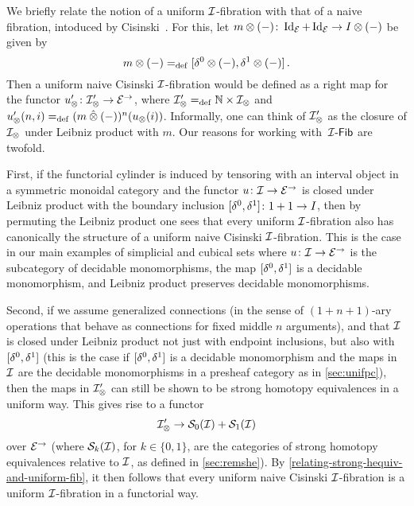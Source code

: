 \documentclass[reqno,10pt,a4paper,oneside,draft]{amsart}
\begin{document}
\begin{remark} We briefly relate the notion of a uniform $\cal{I}$-fibration with that of a naive fibration, intoduced by Cisinski~\cite{cisinski-asterisque}.
For this, let $m \otimes (-)  \co \Id_\catE + \Id_\catE \to \interval \otimes (-)$ be given by 
\[
m \otimes (-) \defeq [\lcyl \otimes (-), \rcyl \otimes (-)]  \, .
\]
Then a uniform naive Cisinski $\cal{I}$-fibration would be defined as a right map for the functor $u_\otimes' \co \cal{I}_\otimes' \to \catE^\to$, where $\cal{I}_\otimes' \defeq \mathbb{N} \times \cal{I}_\otimes$ and $u_\otimes'(n, i) \defeq (m \hatotimes (-))^n(u_\otimes(i))$. Informally, one can think of 
$\cal{I}_\otimes'$ as the closure of  $\cal{I}_\otimes$ under Leibniz product with $m$.
Our reasons for working with~$\Fib[\cal{I}]$ are twofold.

First, if the functorial cylinder is induced by tensoring with an interval object in a symmetric monoidal category and the functor $u \co \cal{I} \to \catE^\to$ is closed under Leibniz product with the boundary inclusion $[\lcyl, \rcyl] \co 1 + 1 \to \interval$, then by permuting the Leibniz product one sees that every uniform $\cal{I}$-fibration also has canonically the structure of a uniform naive Cisinski $\cal{I}$-fibration.
This is the case in our main examples of simplicial and cubical sets where $u \co \cal{I} \to \catE^\to$ is the subcategory of decidable monomorphisms, the map $[\lcyl, \rcyl]$ is a decidable monomorphism, and Leibniz product preserves decidable monomorphisms.

Second, if we assume generalized connections (in the sense of $(1+n+1)$-ary operations that behave as connections for fixed middle $n$ arguments), 
and that $\cal{I}$ is closed under Leibniz product not just with endpoint inclusions, but also with $[\lcyl, \rcyl]$ (this is the case if $[\lcyl, \rcyl]$ is a decidable monomorphism and the maps in $\cal{I}$ are the decidable monomorphisms in a presheaf category as in \cref{sec:unifpc}), then the maps in $\cal{I}_\otimes'$ can still be shown to be strong homotopy equivalences in a uniform way. This gives rise to a functor 
\[
\cal{I}_\otimes' \to \cal{S}_0(\cal{I}) + \cal{S}_1(\cal{I})
\] 
over $\catE^\to$ (where $\cal{S}_k(\cal{I})$, for $k \in \{0,1\}$, are the categories of strong homotopy equivalences relative to $\cal{I}$, as defined in \cref{sec:remshe}). By \cref{relating-strong-hequiv-and-uniform-fib}, it then follows that every uniform naive Cisinski $\cal{I}$-fibration is  a uniform $\cal{I}$-fibration in a functorial way.
\end{remark}
\end{document}
